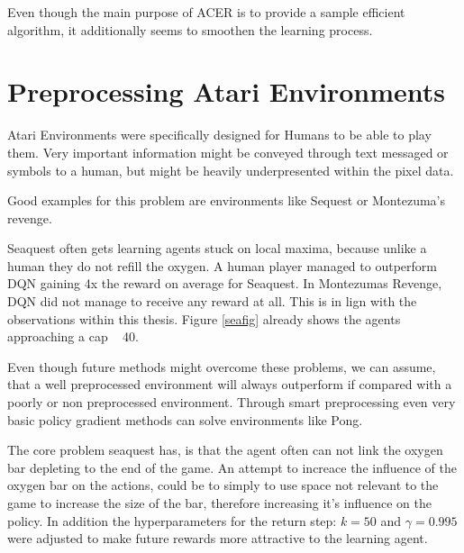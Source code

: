 Even though the main purpose of ACER is to provide a sample efficient algorithm, it additionally seems to smoothen the learning process.


\pagebreak

\section{Preprocessing Atari Environments}

Atari Environments were specifically designed for Humans to be able to play them. Very important information might be conveyed through text messaged or symbols to a human, but might be heavily underpresented within the pixel data.

Good examples for this problem are environments like Sequest or Montezuma's revenge. 

Seaquest often gets learning agents stuck on local maxima, because unlike a human they do not refill the oxygen.
A human player managed to outperform DQN \citep{nature} gaining 4x the reward on average for Seaquest. In Montezumas Revenge, DQN did not manage to receive any reward at all.
This is in lign with the observations within this thesis. Figure \ref{seafig} already shows the agents approaching a cap ~ 40.

Even though future methods might overcome these problems, we can assume, that a well preprocessed environment will always outperform if compared with a poorly or non preprocessed environment.
Through smart preprocessing even very basic policy gradient methods can solve environments like Pong.  \citep{karpathy}

The core problem seaquest has, is that the agent often can not link the oxygen bar depleting to the end of the game. 
An attempt to increace the influence of the oxygen bar on the actions, could be to simply to use space not relevant to the game to increase the size of the bar, therefore increasing it's influence on the policy.
In addition the hyperparameters for the return step: $k=50$ and $\gamma =0.995$ were adjusted to make future rewards more attractive to the learning agent.

